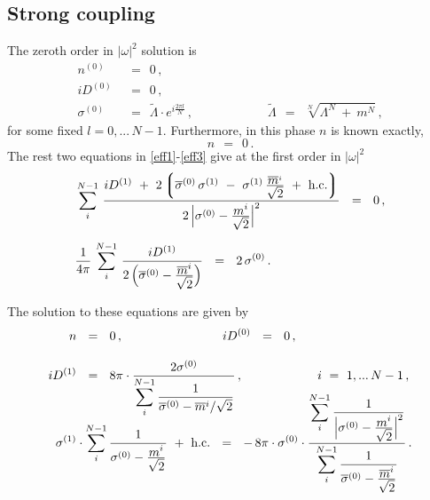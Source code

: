 \documentclass[epsfig,12pt]{article}
\newcommand{\wt}{\widetilde}
\newcommand{\ov}{\overline}
\newcommand{\lgr}{\left\lgroup}
\newcommand{\rgr}{\right\rgroup}
\newcommand{\nz}{{n^{(0)}}}
\newcommand{\Dz}{{D^{(0)}}}
\newcommand{\Do}{{D^{(1)}}}
\newcommand{\sigz}{{\sigma^{(0)}}}
\newcommand{\sigo}{{\sigma^{(1)}}}
\newcommand{\bsigz}{{\ov{\sigma}{}^{(0)}}}
\begin{document}
{%
%
%
\subsection{Strong coupling}

	The zeroth order in $ |\omega|^2 $ solution is 
\begin{align*}
%
	\nz & ~~=~~ 0\,, \\[2mm]
%
	i \Dz & ~~=~~ 0\,, \\[2mm]
%
	\sigz & ~~=~~ \wt{\Lambda}\cdot e^{i\frac{2\pi l}{N}}\,,  
	\qquad\qquad\qquad
	\wt{\Lambda} ~~=~~ \sqrt[N]{ \Lambda^N ~+~ m^N }\,,
\end{align*}
	for some fixed $ l = 0,...\,N-1 $.
	Furthermore, in this phase  $ n $ is known exactly,
\[
	n ~~=~~ 0\,.
\]
	The rest two equations in \eqref{eff1}-\eqref{eff3} give at the first order in $ |\omega|^2 $
\begin{align*}
%
	&
	\sum_{i}^{N-1}\, \frac{ i \Do ~+~ 2 \lgr \bsigz\,\sigo ~-~ 
					\sigo\, \frac{\ov{\displaystyle m}{}^i}{\sqrt{\displaystyle 2}}
				~+~ \text{h.c.} \rgr }
			    { 2\, \Bigl| \sigz - \frac{\displaystyle m^i}{\sqrt{\displaystyle 2}} \Bigr|^2 }
			~~=~~ 0\,,
	\\[2mm]
%
	&
	\frac{1}{4\pi}\, \sum_i^{N-1}\, \frac{i \Do}
				    {2\,\Bigl( \bsigz - \frac{\displaystyle\ov{m}{}^i}{\displaystyle \sqrt{2}} \Bigr) }
			~~=~~ 2\, \sigz\,.
\end{align*}

	The solution to these equations are given by
\begin{align}
%
\notag
	n & ~~=~~ 0 \,,  \qquad\qquad\qquad\qquad i \Dz ~~=~~ 0\,,
	\\[3mm]
%
\label{strongeq}
	i \Do & ~~=~~ 8\pi \cdot \frac{ 2\sigz } 
			{\displaystyle \sum_{i}^{N-1} 
				\frac{1}{ \bsigz - \ov{m}{}^i/\sqrt{2}} } \,,
	\qquad\qquad\qquad i ~=~ 1,...\, N-1\,,
	\\[-8mm]
%
\notag
	\sigo & \cdot \sum_{i}^{N-1} \frac{1}
			{ \sigz - \frac{\displaystyle m^i}{\displaystyle\sqrt{2}} }
		~+~ \text{h.c.} ~~=~~
	-\, 8\pi \cdot \sigz \cdot 
	\frac{ \displaystyle \sum_{i}^{N-1} 
			\frac{1}{ \Bigl| \sigz - \frac{\displaystyle m^i}{\displaystyle\sqrt{2}} \Bigr|^2 } }
	  { \displaystyle \sum_{i}^{N-1} 
				\frac{1}{ \bsigz - \frac{\displaystyle \ov{m}{}^i}
							{\displaystyle \sqrt{2}} } }\,.
\end{align}

}
\end{document}
